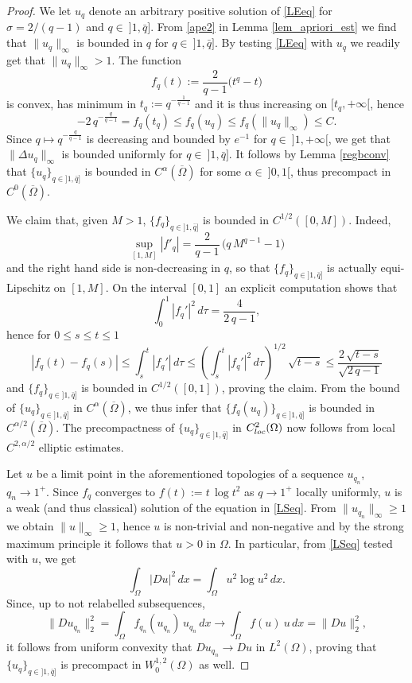 \documentclass[12pt]{amsart}
\numberwithin{equation}{section}
\theoremstyle{plain}
\theoremstyle{plain}
\theoremstyle{plain}
\theoremstyle{definition}
\newcommand{\beq}{\begin{equation}}
\newcommand{\eeq}{\end{equation}}
\renewcommand{\le}{\leqslant}
\renewcommand{\ge}{\geqslant}
\begin{document}
\begin{proof}
 We let $u_q$ denote an arbitrary positive solution of \eqref{LEeq} for $\sigma=2/(q-1)$ and $q\in \ ]1, \bar q]$.
 From \eqref{ape2} in Lemma \ref{lem_apriori_est} we find that $\|u_{q}\|_\infty$ is bounded in $q$ for $q\in\ ]1, \bar q]$. 
By testing \eqref{LEeq} with $u_{q}$ we readily get that $\|u_{q}\|_\infty> 1$. 
The function 
\[
f_q(t) := \frac{2}{q-1}\big(t^q-t\big) 
\]
 is convex, has minimum in $t_q :=q^{-\frac{1}{q-1}}$ and it is thus increasing on $[t_q, +\infty[$, hence
\[
-2\, q^{-\frac{q}{q-1}}=f_q(t_q)\le f_q(u_q)\le f_q(\|u_{q}\|_\infty)\le C.
\]
Since $q\mapsto q^{-\frac{q}{q-1}}$ is decreasing and bounded by $e^{-1}$ for $q\in\ ]1, +\infty[$, we get that $\|\Delta u_q\|_\infty$ is bounded uniformly for $q\in \ ]1, \bar q]$. 
It follows by Lemma \ref{regbconv} that $\{u_q\}_{q\in ]1, \bar q]}$ is bounded in $C^{\alpha}(\overline{\Omega})$ for some $\alpha\in\ ]0, 1[$, thus precompact in $C^0(\overline{\Omega})$. 

We claim that, given $M>1$, $\{f_q\}_{q\in ]1, \bar q]}$ is bounded in $C^{1/2}([0, M])$. Indeed, 
\[
\sup_{[1, M]} |f'_q|=\frac{2}{q-1}\, \big(q\, M^{q-1}-1\big)
\]
and the right hand side is non-decreasing in $q$, so that $\{f_q\}_{q\in ]1, \bar q]}$ is actually equi-Lipschitz on $[1, M]$. 
On the interval $[0, 1]$ an explicit computation shows that
\[
\int_0^1 |f_q'|^2\, d\tau=\frac{4}{2\, q-1},
\]
hence for $0\le s\le t\le 1$
\[
|f_q(t)-f_q(s)|\le \int_s^t|f_q'|\, d\tau\le \left(\int_s^t |f_q'|^2\, d\tau\right)^{1/2}\, \sqrt{t-s}\le \frac{2\, \sqrt{t-s}}{\sqrt{2\, q-1}}
\]
and $\{f_q\}_{q\in ]1, \bar q]}$ is bounded in $C^{1/2}([0, 1])$, proving the claim. 
From the bound of $\{u_q\}_{q\in ]1, \bar q]}$ in $C^{\alpha}(\overline{\Omega})$, we thus infer that $\{f_q(u_q)\}_{q\in ]1, \bar q]}$ is bounded in $C^{\alpha/2}(\overline{\Omega})$. 
The precompactness of $\{u_q\}_{q\in ]1, \bar q]}$ in $C^2_{\rm loc}(\Omega)$ now follows from local $C^{2, \alpha/2}$ elliptic estimates. 

Let $u$ be a limit point in the aforementioned topologies of a sequence $u_{q_n}$, $q_n\to 1^+$. 
Since $f_q$ converges to $f(t):= t\, \log t^2$ as $q\to 1^+$ locally uniformly, $u$ 
is a weak (and thus classical) solution of the equation in \eqref{LSeq}. From $\|u_{q_n}\|_\infty\ge 1$ we obtain $\|u\|_\infty\ge 1$, hence $u$ is non-trivial and non-negative and by the strong maximum principle 
\cite[Theorem 1.1.1]{PuSe07} 
it follows that $u>0$ in $\Omega$. In particular, from \eqref{LSeq} tested with $u$, we get
 \beq
 \label{tlsu}
 \int_\Omega |D u|^2\, dx=\int_\Omega u^2\log u^2\, dx.
 \eeq
Since, up to not relabelled subsequences,
\[
\|Du_{q_n}\|^2_2=\int_{\Omega} f_{q_n}(u_{q_n})\, u_{q_n} \, dx \to \int_{\Omega} f(u) \ u \, dx=\|Du\|_2^2,
\]
it follows from uniform convexity that $Du_{q_n}\to Du$ in $L^2(\Omega)$, proving that $\{u_q\}_{q\in ]1, \bar q]}$ is precompact in $W^{1,2}_0(\Omega)$ as well.


\end{proof}
\end{document}
